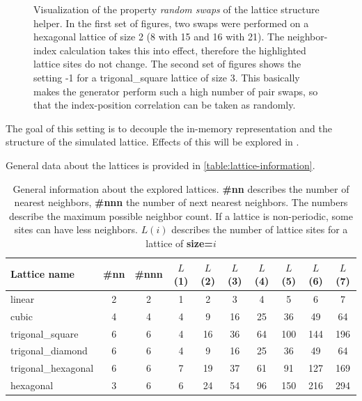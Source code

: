 \begin{figure}[htbp]
    \vspace{0.2cm}
    \caption{Visualization of the property \emph{random swaps} of the lattice structure helper. In the first set of figures, two swaps were performed on a hexagonal lattice of size 2 (8 with 15 and 16 with 21). The neighbor-index calculation takes this into effect, therefore the highlighted lattice sites do not change. The second set of figures shows the setting -1 for a trigonal\_square lattice of size 3. This basically makes the generator perform such a high number of pair swaps, so that the index-position correlation can be taken as randomly. 
    }
    \label{fig:direct-comparison-lattice-site-swaps}
\end{figure}

The goal of this setting is to decouple the in-memory representation and the structure of the simulated lattice. 
Effects of this will be explored in .

General data about the lattices is provided in \autoref{table:lattice-information}.

\begin{table}[htbp]
    \centering
    \begin{tabular}{l|cc|ccccccc} 
        \toprule
        Lattice name & \#nn & \#nnn &$L$(1)&$L$(2)&$L$(3)&$L$(4)&$L$(5)&$L$(6)&$L$(7)\\  
        \midrule 
        linear & 2 & 2 & 1 & 2 & 3 & 4 & 5 & 6 & 7\\
        cubic & 4 & 4 & 4 & 9 & 16 & 25 & 36 & 49 & 64\\
        trigonal\_square & 6 & 6 & 4 & 16 & 36 & 64 & 100 & 144 & 196\\
        trigonal\_diamond & 6 & 6 & 4 & 9 & 16 & 25 & 36 & 49 & 64\\
        trigonal\_hexagonal & 6 & 6 & 7 & 19 & 37 & 61 & 91 & 127 & 169\\
        hexagonal & 3 & 6 & 6 & 24 & 54 & 96 & 150 & 216 & 294\\
        \bottomrule
    \end{tabular}
    \vspace{0.5cm}
    \caption{General information about the explored lattices. \textbf{\#nn} describes the number of nearest neighbors, \textbf{\#nnn} the number of next nearest neighbors. The numbers describe the maximum possible neighbor count. If a lattice is non-periodic, some sites can have less neighbors. $L(i)$ describes the number of lattice sites for a lattice of \textbf{size=$i$}}
    \label{table:lattice-information}
\end{table}





